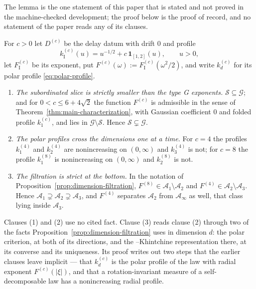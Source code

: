 The lemma is the one statement of this paper that is stated and not proved in the
machine-checked development; the proof below is the proof of record, and no statement of the
paper reads any of its clauses.

\begin{lemma}
\label{lem:filtration-strictness}
For $c > 0$ let $D^{(c)}$ be the delay datum with drift $0$ and profile
\[
  k^{(c)}_{\mathrm I}(u) = u^{-1/2} + c\,\mathbf{1}_{[1,2]}(u), \qquad u > 0 ,
\]
let $F^{(c)}_{\mathrm I}$ be its exponent, put
$F^{(c)}(\omega) := F^{(c)}_{\mathrm I}(\omega^2/2)$, and write $k^{(c)}_d$ for its polar profile
\ref{eq:polar-profile}.
\begin{enumerate}
\item \emph{The subordinated slice is strictly smaller than the type G exponents.}
$\mathcal{S} \subseteq \mathcal{G}$; and for $0 < c \le 6 + 4\sqrt2$ the function $F^{(c)}$ is
admissible in the sense of Theorem~\ref{thm:main-characterization}, with Gaussian coefficient
$0$ and folded profile $k^{(c)}_1$, and lies in $\mathcal{G} \setminus \mathcal{S}$. Hence
$\mathcal{S} \subsetneq \mathcal{G}$.
\item \emph{The polar profiles cross the dimensions one at a time.} For $c = 4$ the profiles
$k^{(4)}_1$ and $k^{(4)}_2$ are nonincreasing on $(0,\infty)$ and $k^{(4)}_3$ is not; for $c = 8$
the profile $k^{(8)}_1$ is nonincreasing on $(0,\infty)$ and $k^{(8)}_2$ is not.
\item \emph{The filtration is strict at the bottom.} In the notation of
Proposition~\ref{prop:dimension-filtration}, $F^{(8)} \in \mathcal{A}_1 \setminus \mathcal{A}_2$ and
$F^{(4)} \in \mathcal{A}_2 \setminus \mathcal{A}_3$. Hence
$\mathcal{A}_1 \supsetneq \mathcal{A}_2 \supsetneq \mathcal{A}_3$, and $F^{(4)}$ separates
$\mathcal{A}_2$ from $\mathcal{A}_\infty$ as well, that class lying inside $\mathcal{A}_3$.
\end{enumerate}
\end{lemma}

Clauses (1) and (2) use no cited fact. Clause (3) reads clause (2) through two of the facts
Proposition~\ref{prop:dimension-filtration} uses in dimension $d$: the polar criterion, at both
of its directions, and the \Levy--Khintchine representation there, at its converse and its
uniqueness. Its proof writes out two steps that the earlier clauses leave implicit --- that
$k^{(c)}_d$ is the polar profile of the law with radial exponent $F^{(c)}(|\xi|)$, and that a
rotation-invariant \Levy{} measure of a self-decomposable law has a nonincreasing radial profile.

